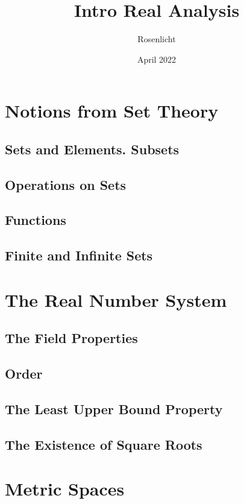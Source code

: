 \documentclass{article}
\title{Intro Real Analysis}
\author{Rosenlicht}
\date{April 2022}
\begin{document}
	
	\maketitle
	\tableofcontents
	
	\section{Notions from Set Theory}
		\subsection{Sets and Elements. Subsets}
		
		\subsection{Operations on Sets}
		
		\subsection{Functions}
		
		\subsection{Finite and Infinite Sets}
	
	\section{The Real Number System}
		\subsection{The Field Properties}
		
		\subsection{Order}
		
		\subsection{The Least Upper Bound Property}
		
		\subsection{The Existence of Square Roots}

	
	\section{Metric Spaces}
\end{document}
